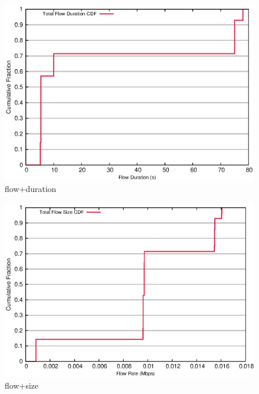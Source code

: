 \documentclass[landscape]{article}
\begin{document}
\begin{figure}[!hbt]
\centering
\includegraphics[width=1\textwidth]{flow_duration.eps}
\caption{flow+duration}

\end{figure}


\newpage

\begin{figure}[!hbt]
\centering
\includegraphics[width=1\textwidth]{flow_size.eps}
\caption{flow+size}

\end{figure}
\end{document}

